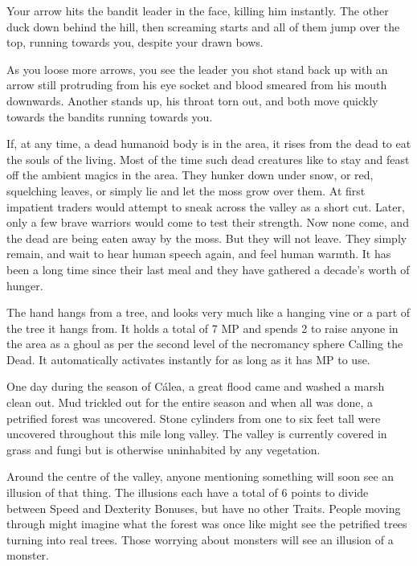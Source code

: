\begin{multicols}{2}
\begin{boxtext}

	Your arrow hits the bandit leader in the face, killing him instantly.
	The other duck down behind the hill, then screaming starts and all of them jump over the top, running towards you, despite your drawn bows.

	As you loose more arrows, you see the leader you shot stand back up with an arrow still protruding from his eye socket and blood smeared from his mouth downwards.
	Another stands up, his throat torn out, and both move quickly towards the bandits running towards you.

\end{boxtext}

If, at any time, a dead humanoid body is in the area, it rises from the dead to eat the souls of the living.  Most of the time such dead creatures like to stay and feast off the ambient magics in the area.  They hunker down under snow, or red, squelching leaves, or simply lie and let the moss grow over them.   At first impatient traders would attempt to sneak across the valley as a short cut.  Later, only a few brave warriors would come to test their strength.  Now none come, and the dead are being eaten away by the moss.  But they will not leave.  They simply remain, and wait to hear human speech again, and feel human warmth.  It has been a long time since their last meal and they have gathered a decade's worth of hunger.

The hand hangs from a tree, and looks very much like a hanging vine or a part of the tree it hangs from.
It holds a total of 7 MP and spends 2 to raise anyone in the area as a ghoul as per the second level of the necromancy sphere Calling the Dead.
It automatically activates instantly for as long as it has MP to use.


One day during the season of C\'{a}lea, a great flood came and washed a marsh clean out.  Mud trickled out for the entire season and when all was done, a petrified forest was uncovered.  Stone cylinders from one to six feet tall were uncovered throughout this mile long valley.  The valley is currently covered in grass and fungi but is otherwise uninhabited by any vegetation.

Around the centre of the valley, anyone mentioning something will soon see an illusion of that thing.  The illusions each have a total of 6 points to divide between Speed and Dexterity Bonuses, but have no other Traits.  People moving through might imagine what the forest was once like might see the petrified trees turning into real trees.  Those worrying about monsters will see an illusion of a monster.


\end{multicols}
